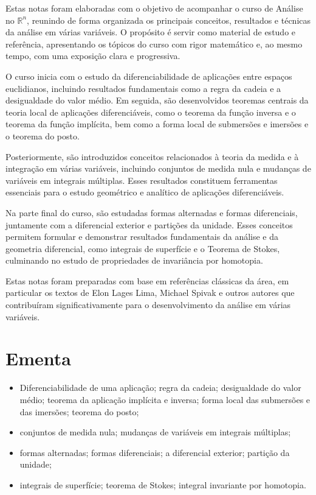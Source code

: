 Estas notas foram elaboradas com o objetivo de acompanhar o curso de Análise no $\mathbb{R}^n$, reunindo de forma organizada os principais conceitos, resultados e técnicas da análise em várias variáveis. O propósito é servir como material de estudo e referência, apresentando os tópicos do curso com rigor matemático e, ao mesmo tempo, com uma exposição clara e progressiva.

O curso inicia com o estudo da diferenciabilidade de aplicações entre espaços euclidianos, incluindo resultados fundamentais como a regra da cadeia e a desigualdade do valor médio. Em seguida, são desenvolvidos teoremas centrais da teoria local de aplicações diferenciáveis, como o teorema da função inversa e o teorema da função implícita, bem como a forma local de submersões e imersões e o teorema do posto.

Posteriormente, são introduzidos conceitos relacionados à teoria da medida e à integração em várias variáveis, incluindo conjuntos de medida nula e mudanças de variáveis em integrais múltiplas. Esses resultados constituem ferramentas essenciais para o estudo geométrico e analítico de aplicações diferenciáveis.

Na parte final do curso, são estudadas formas alternadas e formas diferenciais, juntamente com a diferencial exterior e partições da unidade. Esses conceitos permitem formular e demonstrar resultados fundamentais da análise e da geometria diferencial, como integrais de superfície e o Teorema de Stokes, culminando no estudo de propriedades de invariância por homotopia.

Estas notas foram preparadas com base em referências clássicas da área, em particular os textos de Elon Lages Lima, Michael Spivak e outros autores que contribuíram significativamente para o desenvolvimento da análise em várias variáveis.

\section*{Ementa}

\begin{itemize}
    \item Diferenciabilidade de uma aplicação; regra da cadeia; desigualdade do valor médio; teorema da aplicação implícita e inversa; forma local das submersões e das imersões; teorema do posto;
    
    \item conjuntos de medida nula; mudanças de variáveis em integrais múltiplas;
    
    \item formas alternadas; formas diferenciais; a diferencial exterior; partição da unidade;
    
    \item integrais de superfície; teorema de Stokes; integral invariante por homotopia.
\end{itemize}

